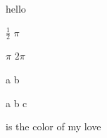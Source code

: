 \documentclass[12pt,answers]{exam}
\begin{document}
\begin{questions}
\question hello
\end{questions}


\begin{choices}
\choice $\frac{1}{2}$ 
\choice $\pi$
\end{choices}

\begin{oneparchoices}
\choice $\pi$ 
\choice $2\pi$
\end{oneparchoices}
\begin{checkboxes}
\choice a 
\choice b
\end{checkboxes}
\begin{oneparcheckboxes}
\choice a 
\choice b
\CorrectChoice c
\end{oneparcheckboxes}

\begin{questions}
\question  \fillin[$answer$] is the color of my love
\end{questions}
\end{document}
